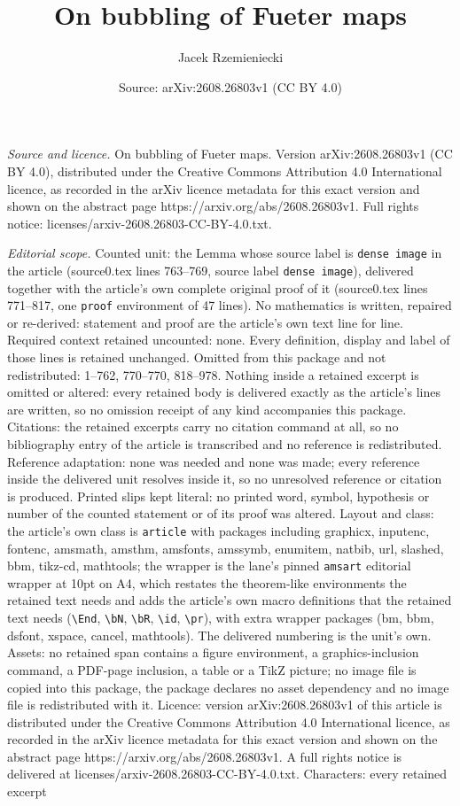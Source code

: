 \documentclass[10pt,a4paper]{amsart}
\title[On bubbling of Fueter maps]{On bubbling of Fueter maps}
\author{Jacek Rzemieniecki}
\date{Source: arXiv:2608.26803v1 (CC BY 4.0)}
\begin{document}
\maketitle

\noindent\emph{Source and licence.} On bubbling of Fueter maps. Version arXiv:2608.26803v1 (CC BY 4.0), distributed under the Creative Commons Attribution 4.0 International licence, as recorded in the arXiv licence metadata for this exact version and shown on the abstract page https://arxiv.org/abs/2608.26803v1. Full rights notice: licenses/arxiv-2608.26803-CC-BY-4.0.txt.\par\smallskip

\noindent\textit{Editorial scope.} Counted unit: the Lemma whose source label is \texttt{dense image} in the article (source0.tex lines 763--769, source label \texttt{dense image}), delivered together with the article's own complete original proof of it (source0.tex lines 771--817, one \texttt{proof} environment of 47 lines). No mathematics is written, repaired or re-derived: statement and proof are the article's own text line for line. Required context retained uncounted: none. Every definition, display and label of those lines is retained unchanged. Omitted from this package and not redistributed: 1--762, 770--770, 818--978. Nothing inside a retained excerpt is omitted or altered: every retained body is delivered exactly as the article's lines are written, so no omission receipt of any kind accompanies this package. Citations: the retained excerpts carry no citation command at all, so no bibliography entry of the article is transcribed and no reference is redistributed. Reference adaptation: none was needed and none was made; every reference inside the delivered unit resolves inside it, so no unresolved reference or citation is produced. Printed slips kept literal: no printed word, symbol, hypothesis or number of the counted statement or of its proof was altered. Layout and class: the article's own class is \texttt{article} with packages including graphicx, inputenc, fontenc, amsmath, amsthm, amsfonts, amssymb, enumitem, natbib, url, slashed, bbm, tikz-cd, mathtools; the wrapper is the lane's pinned \texttt{amsart} editorial wrapper at 10pt on A4, which restates the theorem-like environments the retained text needs and adds the article's own macro definitions that the retained text needs (\texttt{\textbackslash End}, \texttt{\textbackslash bN}, \texttt{\textbackslash bR}, \texttt{\textbackslash id}, \texttt{\textbackslash pr}), with extra wrapper packages (bm, bbm, dsfont, xspace, cancel, mathtools). The delivered numbering is the unit's own. Assets: no retained span contains a figure environment, a graphics-inclusion command, a PDF-page inclusion, a table or a TikZ picture; no image file is copied into this package, the package declares no asset dependency and no image file is redistributed with it. Licence: version arXiv:2608.26803v1 of this article is distributed under the Creative Commons Attribution 4.0 International licence, as recorded in the arXiv licence metadata for this exact version and shown on the abstract page https://arxiv.org/abs/2608.26803v1. A full rights notice is delivered at licenses/arxiv-2608.26803-CC-BY-4.0.txt. Characters: every retained excerpt 
\end{document}
